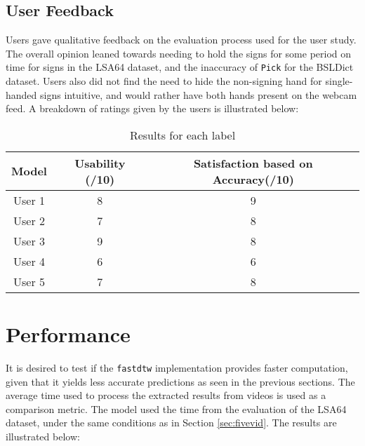 \documentclass[final,rdr32.tex]{subfiles}
\begin{document}
\subsection{User Feedback}

Users gave qualitative feedback on the evaluation process used for the user study. The overall opinion leaned towards needing to hold the signs for some period on time for signs in the LSA64 dataset, and the inaccuracy of \verb|Pick| for the BSLDict dataset. Users also did not find the need to hide the non-signing hand for single-handed signs intuitive, and would rather have both hands present on the webcam feed. A breakdown of ratings given by the users is illustrated below:

\begin{table}[H]
    \begin{center}
        \begin{tabular}{ |c|c|c| }
            \hline
            Model  & Usability (/10) & Satisfaction based on Accuracy(/10) \\
            \hline
            User 1 & 8               & 9                                   \\
            User 2 & 7               & 8                                   \\
            User 3 & 9               & 8                                   \\
            User 4 & 6               & 6                                   \\
            User 5 & 7               & 8                                   \\
            \hline
        \end{tabular}
    \end{center}
    \caption{Results for each label}
    \label{tab:feedback}
\end{table}

\section{Performance}
\label{sec:performance}

It is desired to test if the \verb|fastdtw| implementation provides faster computation, given that it yields less accurate predictions as seen in the previous sections. The average time used to process the extracted results from videos is used as a comparison metric. The model used the time from the evaluation of the LSA64 dataset, under the same conditions as in Section \ref{sec:fivevid}. The results are illustrated below:
\end{document}

